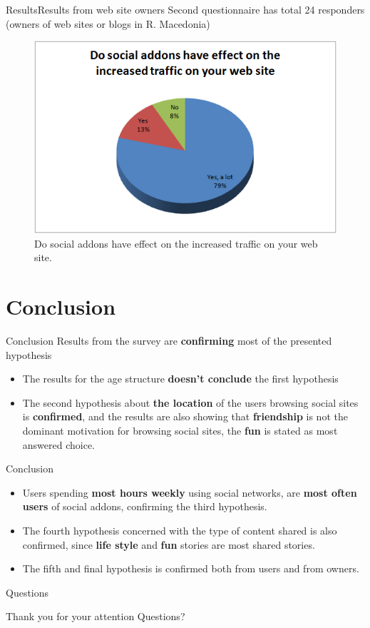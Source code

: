\begin{frame}{Results}{Results from web site owners}
Second questionnaire has total 24 responders (owners of web sites or blogs in
R. Macedonia)
      \begin{figure}
    \centering
        \includegraphics[width=.6\textwidth]{images/viral/effect}
        \caption{Do social addons have effect on the increased traffic on your web
site.}
        \label{fig:effect}
    \end{figure}
\end{frame}

\section{Conclusion}

\begin{frame}{Conclusion}
    Results from the survey are \textbf{confirming} most of the presented hypothesis
    \begin{itemize}
      \item The results for the age structure \textbf{doesn’t conclude} the first
      hypothesis
      \item The second hypothesis about \textbf{the location} of the users browsing
      social sites is \textbf{confirmed}, and the results are also showing that
      \textbf{friendship} is not the dominant motivation for browsing social
      sites, the \textbf{fun} is stated as most answered choice.
    \end{itemize}
\end{frame}

\begin{frame}{Conclusion}
    \begin{itemize}
      \item Users spending \textbf{most hours weekly} using social networks,
are \textbf{most often users} of social addons, confirming the third hypothesis.
        \item The fourth hypothesis concerned with the type of content shared is
        also confirmed, since \textbf{life style} and \textbf{fun} stories are most shared stories.
        \item The fifth and final hypothesis is confirmed both from users and
        from owners.
    \end{itemize}
\end{frame}

\begin{frame}{Questions}{}
    \begin{center}
    \vfill
    \huge{Thank you for your attention}
    \vfill    
    \Huge{Questions?}
    \end{center}
\end{frame}







